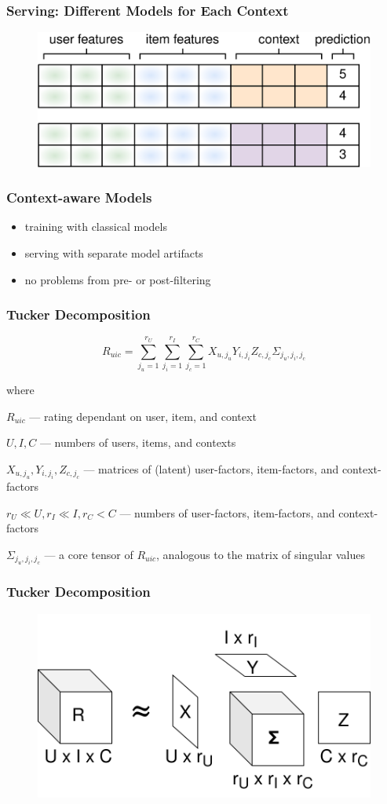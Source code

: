\documentclass[t]{beamer}
\begin{document}
\begin{frame}
  \frametitle{Serving: Different Models for Each Context}
  \begin{figure}
  \includegraphics[scale=0.25]{context-aware-3}
  \end{figure}
\end{frame}
\begin{frame}
  \frametitle{Context-aware Models}
  \begin{itemize}
  \item training with classical models
  \item serving with separate model artifacts
  \item no problems from pre- or post-filtering
  \end{itemize}
\end{frame}
\begin{frame}
  \frametitle{Tucker Decomposition}
$$R_{uic}=\sum\limits_{j_u=1}^{r_U}\sum\limits_{j_i=1}^{r_I}\sum\limits_{j_c=1}^{r_C}X_{u,j_u}Y_{i,j_i}Z_{c,j_c}\Sigma_{j_u,j_i,j_c}$$
  
  where

  $R_{uic}$ --- rating dependant on user, item, and context

  $U,I,C$ --- numbers of users, items, and contexts
  
  $X_{u,j_u},Y_{i,j_i},Z_{c,j_c}$ --- matrices of (latent) user-factors, item-factors, and context-factors

  $r_U\ll U,r_I\ll I,r_C<C$ --- numbers of user-factors, item-factors, and context-factors

  $\Sigma_{j_u,j_i,j_c}$ --- a core tensor of $R_{uic}$, analogous to the matrix of singular values
\end{frame}
\begin{frame}
  \frametitle{Tucker Decomposition}
  \begin{figure}
  \includegraphics[scale=0.3]{tucker}
  \end{figure}
\end{frame}
\end{document}

